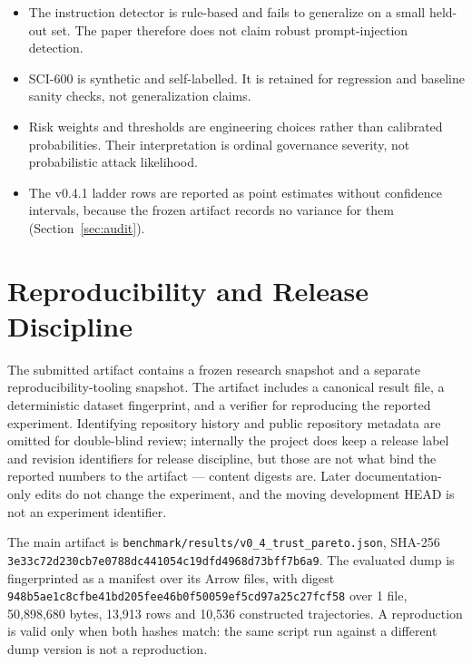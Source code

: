 \documentclass[letterpaper,twocolumn,10pt]{article}
\newcommand{\hb}{\allowbreak}
\begin{document}
\begin{itemize}
\item The instruction detector is rule-based and fails to generalize on a small
held-out set. The paper therefore does not claim robust prompt-injection
detection.

\item SCI-600 is synthetic and self-labelled. It is retained for regression and
baseline sanity checks, not generalization claims.

\item Risk weights and thresholds are engineering choices rather than calibrated
probabilities. Their interpretation is ordinal governance severity, not
probabilistic attack likelihood.

\item The v0.4.1 ladder rows are reported as point estimates without confidence
intervals, because the frozen artifact records no variance for them
(Section~\ref{sec:audit}).

\end{itemize}

\section{Reproducibility and Release Discipline}
\label{sec:repro}

The submitted artifact contains a frozen research snapshot and a separate
reproducibility-tooling snapshot. The artifact includes a canonical result
file, a deterministic dataset fingerprint, and a verifier for reproducing the
reported experiment. Identifying repository history and public repository
metadata are omitted for double-blind review; internally the project does keep
a release label and revision identifiers for release discipline, but those are
not what bind the reported numbers to the artifact --- content digests are.
Later documentation-only edits do not change the experiment, and the moving
development HEAD is not an experiment identifier.

The main artifact is \texttt{benchmark/results/v0\_4\_trust\_pareto.json},
SHA-256 \texttt{3e33\hb c72d\hb 230c\hb b7e0\hb 788d\hb c441\hb 2574\hb 054c\hb 19df\hb d496\hb 5465\hb 7369\hb 8d73\hb bff7\hb b6a9\hb 0565}.
The evaluated dump is fingerprinted as a manifest over its Arrow files, with
digest \texttt{948b\hb 9432\hb 5ae1\hb c8cf\hb be41\hb bd20\hb 5fee\hb 46b0\hb f500\hb 2155\hb 59ef\hb 5cd9\hb 7a25\hb c27f\hb cf58\hb 0049}
over 1 file, 50,898,680 bytes, 13,913 rows and 10,536 constructed trajectories.
A reproduction is valid only when both hashes match: the same script run against
a different dump version is not a reproduction.
\end{document}
